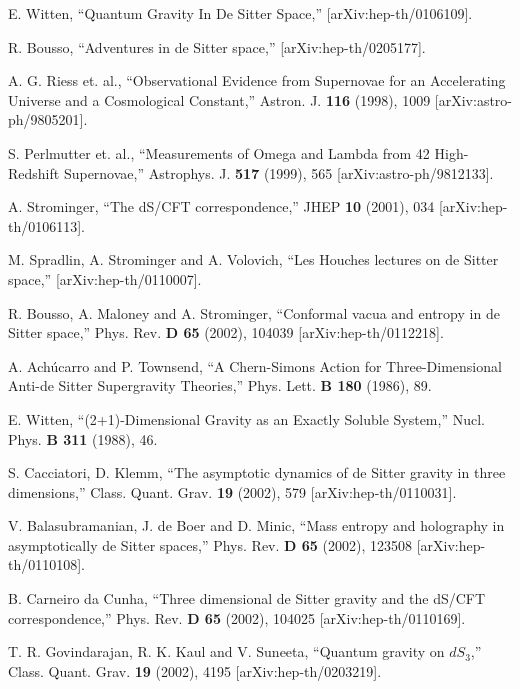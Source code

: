 \documentclass[a4paper,11pt]{article}
\begin{document}

\begin{thebibliography}{99}

E. Witten,
``Quantum Gravity In De Sitter Space,''
[arXiv:hep-th/0106109].

R. Bousso,
``Adventures in de Sitter space,'' 
[arXiv:hep-th/0205177].

A. G. Riess et. al.,
``Observational Evidence from Supernovae for an Accelerating Universe
and a Cosmological Constant,''
Astron. J. {\bf 116} (1998), 1009 [arXiv:astro-ph/9805201].

S. Perlmutter et. al.,
``Measurements of Omega and Lambda from 42 High-Redshift Supernovae,''
Astrophys. J. {\bf 517} (1999), 565 [arXiv:astro-ph/9812133].  

A. Strominger,
``The dS/CFT correspondence,''
JHEP {\bf 10} (2001), 034 [arXiv:hep-th/0106113].

M. Spradlin, A. Strominger and A. Volovich,
``Les Houches lectures on de Sitter space,''
[arXiv:hep-th/0110007].

R. Bousso, A. Maloney and A. Strominger,
``Conformal vacua and entropy in de Sitter space,''
Phys. Rev. {\bf D 65} (2002), 104039 [arXiv:hep-th/0112218].

A. Ach\'ucarro and P. Townsend,
``A Chern-Simons Action for Three-Dimensional Anti-de Sitter
Supergravity Theories,''
Phys. Lett. {\bf B 180} (1986), 89.

E. Witten,
``(2+1)-Dimensional Gravity as an Exactly Soluble System,''
Nucl. Phys. {\bf B 311} (1988), 46.

S. Cacciatori, D. Klemm, 
``The asymptotic dynamics of de Sitter gravity in three dimensions,''
Class. Quant. Grav.  {\bf 19} (2002), 579 [arXiv:hep-th/0110031].

V. Balasubramanian, J. de Boer and D. Minic,
``Mass entropy and holography in asymptotically de Sitter spaces,''
Phys. Rev. {\bf D 65} (2002), 123508 [arXiv:hep-th/0110108].

B. Carneiro da Cunha,
``Three dimensional de Sitter gravity and the dS/CFT correspondence,''
Phys. Rev. {\bf D 65} (2002), 104025 [arXiv:hep-th/0110169].

T. R. Govindarajan, R. K. Kaul and V. Suneeta,
``Quantum gravity on $dS_{3}$,''
Class. Quant. Grav. {\bf 19} (2002), 4195 [arXiv:hep-th/0203219]. 


\end{thebibliography}
\end{document}
